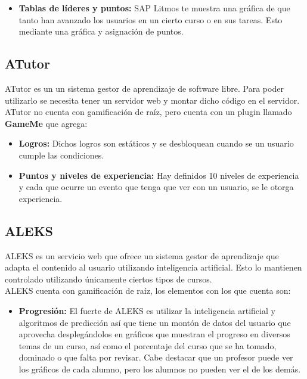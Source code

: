 \begin{multicols*}{2}
\begin{itemize}
        \item {\bf Tablas de líderes y puntos: } SAP Litmos te muestra una
         gráfica de que tanto han avanzado los usuarios en un cierto curso
         o en sus tareas. Esto mediante una gráfica y asignación de puntos.

    \end{itemize}


\subsection*{ATutor}

 ATutor es un un sistema gestor de aprendizaje de software libre. Para poder
 utilizarlo se necesita tener un servidor web y montar dicho código en el servidor.\\

    \noindent ATutor no cuenta con gamificación de raíz,
    pero cuenta con un plugin llamado \textbf{GameMe} que agrega:

    \begin{itemize}
        \item {\bf Logros:} Dichos logros son estáticos y se
        desbloquean cuando se un usuario cumple las condiciones.

        \item {\bf Puntos y niveles de experiencia:} Hay definidos 10
        niveles de experiencia y cada que ocurre un evento que tenga
        que ver con un usuario, se le otorga experiencia.

    \end{itemize}



\subsection*{ALEKS}

 ALEKS es un servicio web que ofrece un sistema gestor de aprendizaje
 que adapta el contenido al usuario utilizando inteligencia artificial.
 Esto lo mantienen controlado utilizando únicamente ciertos tipos de cursos.\\

    \noindent ALEKS cuenta con gamificación de raíz, los elementos con los que cuenta son:

    \begin{itemize}
        \item {\bf Progresión:} El fuerte de ALEKS es utilizar la inteligencia
        artificial y algoritmos de predicción así que tiene un montón de datos del
        usuario que aprovecha desplegándolos en gráficos que muestran el progreso
        en diversos temas de un curso, así como el porcentaje del curso que se ha
        tomado, dominado o que falta por revisar. Cabe destacar que un profesor puede
        ver los gráficos de cada alumno, pero los alumnos no pueden ver el de los demás.


\end{itemize}
\end{multicols*}
